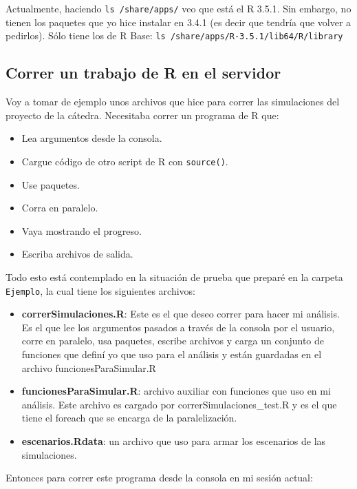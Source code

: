\documentclass[paper=a4, fontsize=11pt]{article} %
\numberwithin{equation}{section} %
\numberwithin{figure}{section} %
\numberwithin{table}{section} %
\begin{document}
Actualmente, haciendo \texttt{ls /share/apps/} veo que está el R 3.5.1. Sin embargo, no tienen los paquetes que yo hice instalar en 3.4.1 (es decir que tendría que volver a pedirlos). Sólo tiene los de R Base:
\texttt{ls /share/apps/R-3.5.1/lib64/R/library}

\subsection{Correr un trabajo de R en el servidor}

Voy a tomar de ejemplo unos archivos que hice para correr las simulaciones del proyecto de la cátedra. Necesitaba correr un programa de R que:

\begin{itemize}
	\item Lea argumentos desde la consola.
	\item Cargue código de otro script de R con \texttt{source()}.
	\item Use paquetes.
	\item Corra en paralelo.
	\item Vaya mostrando el progreso.
	\item Escriba archivos de salida.
\end{itemize}

Todo esto está contemplado en la situación de prueba que preparé en la carpeta \texttt{Ejemplo}, la cual tiene los siguientes archivos:

\begin{itemize}
	\item \textbf{correrSimulaciones.R}: Este es el que deseo correr para hacer mi análisis. Es el que lee los argumentos pasados a través de la consola por el usuario, corre en paralelo, usa paquetes, escribe archivos y carga un conjunto de funciones que definí yo que uso para el análisis y están guardadas en el archivo funcionesParaSimular.R

	\item \textbf{funcionesParaSimular.R}: archivo auxiliar con funciones que uso en mi análisis. Este archivo es cargado por correrSimulaciones\_test.R y es el que tiene el foreach que se encarga de la paralelización.
	
	\item \textbf{escenarios.Rdata}: un archivo que uso para armar los escenarios de las simulaciones.
\end{itemize}

Entonces para correr este programa desde la consola en mi sesión actual:
\end{document}
